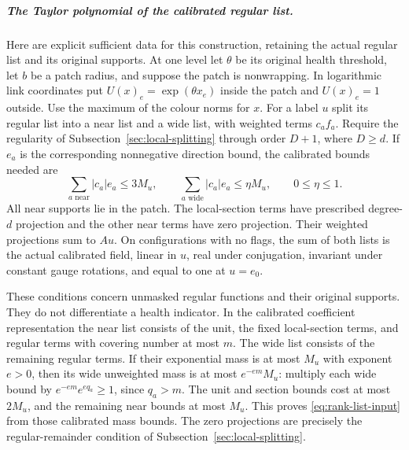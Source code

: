 \subparagraph{The Taylor polynomial of the calibrated regular list.}
Here are explicit sufficient data for this construction, retaining the
actual regular list and its original supports. At one level let
$\theta$ be its original health threshold, let $b$ be a patch radius,
and suppose the patch is nonwrapping. In logarithmic link coordinates
put $U(x)_e=\exp(\theta x_e)$ inside the patch and $U(x)_e=1$ outside.
Use the maximum of the colour norms for $x$. For a label $u$ split its
regular list into a near list and a wide list, with weighted terms
$c_a f_a$. Require the regularity of Subsection~\ref{sec:local-splitting}
through order $D+1$, where $D\ge d$. If $e_a$ is the corresponding
nonnegative direction bound, the calibrated bounds needed are
\begin{equation}\label{eq:rank-list-input}
 \sum_{a\text{ near}}|c_a|e_a\le3M_u,\qquad
 \sum_{a\text{ wide}}|c_a|e_a\le\eta M_u,\qquad
 0\le\eta\le1.
\end{equation}
All near supports lie in the patch. The local-section terms have
prescribed degree-$d$ projection and the other near terms have zero
projection. Their weighted projections sum to $Au$. On configurations
with no flags, the sum of both lists is the actual calibrated field,
linear in $u$, real under conjugation, invariant under constant gauge
rotations, and equal to one at $u=e_0$.

These conditions concern unmasked regular functions and their original
supports. They do not differentiate a health indicator. In the calibrated
coefficient representation the near list consists of the unit, the
fixed local-section terms, and regular terms with covering number at
most $m$. The wide list consists of the remaining regular terms.
If their exponential mass is at most $M_u$ with exponent $e>0$,
then its wide unweighted mass is at most $e^{-em}M_u$: multiply each
wide bound by $e^{-em}e^{e q_a}\ge1$, since $q_a>m$.
The unit and section bounds cost at most $2M_u$, and the remaining
near bounds at most $M_u$. This proves \eqref{eq:rank-list-input}
from those calibrated mass bounds. The zero projections are precisely
the regular-remainder condition of Subsection~\ref{sec:local-splitting}.

